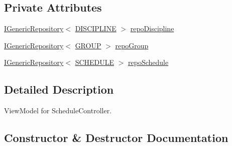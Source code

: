 \subsection*{Private Attributes}
\begin{DoxyCompactItemize}
\item 
\hyperlink{interface_repo_1_1_common_1_1_i_generic_repository}{I\+Generic\+Repository}$<$ \hyperlink{class_e_f_oracle_1_1_model_1_1_d_i_s_c_i_p_l_i_n_e}{D\+I\+S\+C\+I\+P\+L\+I\+NE} $>$ \hyperlink{class_in_study_asp_1_1_models_1_1_user_1_1_teacher_1_1_view_model_schedule_af83b9134a2fb82ac95d54bae3048b634}{repo\+Discipline}
\item 
\hyperlink{interface_repo_1_1_common_1_1_i_generic_repository}{I\+Generic\+Repository}$<$ \hyperlink{class_e_f_oracle_1_1_model_1_1_g_r_o_u_p}{G\+R\+O\+UP} $>$ \hyperlink{class_in_study_asp_1_1_models_1_1_user_1_1_teacher_1_1_view_model_schedule_ae6fcb15e9c68b57ded9300e873d5e1fc}{repo\+Group}
\item 
\hyperlink{interface_repo_1_1_common_1_1_i_generic_repository}{I\+Generic\+Repository}$<$ \hyperlink{class_e_f_oracle_1_1_model_1_1_s_c_h_e_d_u_l_e}{S\+C\+H\+E\+D\+U\+LE} $>$ \hyperlink{class_in_study_asp_1_1_models_1_1_user_1_1_teacher_1_1_view_model_schedule_a6c85660782fd7647ca942cc759988872}{repo\+Schedule}
\end{DoxyCompactItemize}


\subsection{Detailed Description}
View\+Model for Schedule\+Controller. 

\subsection{Constructor \& Destructor Documentation}
\mbox{\label{class_in_study_asp_1_1_models_1_1_user_1_1_teacher_1_1_view_model_schedule_a2a6f9735138119885135e10599792ebc}} 
